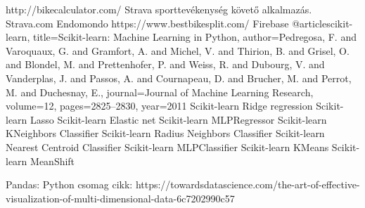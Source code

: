 \begin{thebibliography}{x}

 http://bikecalculator.com/
 Strava sporttevékenység követő alkalmazás. Strava.com 
 Endomondo
	https://www.bestbikesplit.com/
 Firebase
@article{scikit-learn,
	title={Scikit-learn: Machine Learning in {P}ython},
	author={Pedregosa, F. and Varoquaux, G. and Gramfort, A. and Michel, V.
		and Thirion, B. and Grisel, O. and Blondel, M. and Prettenhofer, P.
		and Weiss, R. and Dubourg, V. and Vanderplas, J. and Passos, A. and
		Cournapeau, D. and Brucher, M. and Perrot, M. and Duchesnay, E.},
	journal={Journal of Machine Learning Research},
	volume={12},
	pages={2825--2830},
	year={2011}
}
 Scikit-learn Ridge regression
 Scikit-learn Lasso
	Scikit-learn Elastic net
 Scikit-learn MLPRegressor
 Scikit-learn KNeighbors Classifier
 Scikit-learn Radius Neighbors Classifier
 Scikit-learn Nearest Centroid Classifier
 Scikit-learn MLPClassifier
 Scikit-learn KMeans
 Scikit-learn MeanShift
	
 Pandas: Python csomag
  cikk: https://towardsdatascience.com/the-art-of-effective-visualization-of-multi-dimensional-data-6c7202990c57

\iffalse
\bibitem{citekey} forrás megjelölés
\bibitem{Hohmeyer} M. E. Hohmeyer, B. A. Barsky: Rational continuity: parametric, geometric and Frenet frame
continuity of rational curves, {\em ACM Transactions on Graphics}, \textbf{8} (1989), 335--359.
\bibitem{TeX_Catalogue} \TeX\ Catalogue, {\ttfamily www.ctan.org/tex-archive/help/Catalogue/catalogue.html} 
\fi
\end{thebibliography}